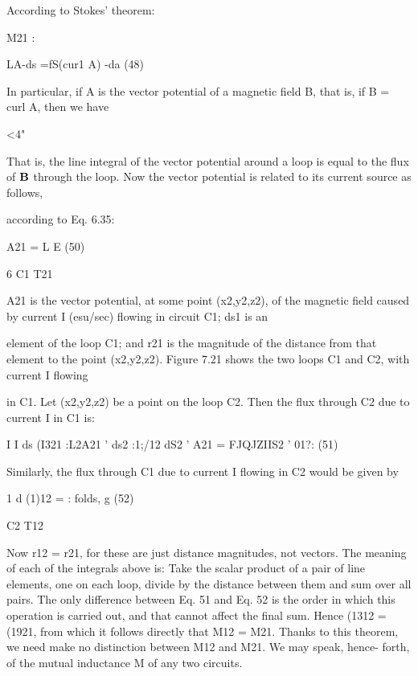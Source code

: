 According to Stokes' theorem:

\begin{equation}
\end{equation}
M21 :

LA-ds =fS(cur1 A) -da (48)

In particular, if A is the vector potential of a magnetic field B, that is,
if B = curl A, then we have

\begin{equation}
\end{equation}
<4"

That is, the line integral of the vector potential around a loop is equal
to the flux of $\mathbf{B}$ through the loop.
Now the vector potential is related to its current source as follows,

according to Eq. 6.35:

\begin{equation}
\end{equation}
A21 = L E (50)

6 C1 T21

A21 is the vector potential, at some point (x2,y2,z2), of the magnetic
field caused by current I (esu/sec) flowing in circuit C1; ds1 is an

element of the loop C1; and r21 is the magnitude of the distance from
that element to the point (x2,y2,z2).
Figure 7.21 shows the two loops C1 and C2, with current I flowing

in C1. Let (x2,y2,z2) be a point on the loop C2. Then the flux
through C2 due to current I in C1 is:

\begin{equation}
\end{equation}
I I ds
(I321 :L2A21 ' ds2 :1;/12 dS2 ' A21 = FJQJZIIS2 ' 01?: (51)

Similarly, the flux through C1 due to current I flowing in C2 would
be given by

\begin{equation}
\end{equation}
1 d
(1)12 = : folds, g (52)

C2 T12

Now r12 = r21, for these are just distance magnitudes, not vectors.
The meaning of each of the integrals above is: Take the scalar product
of a pair of line elements, one on each loop, divide by the distance
between them and sum over all pairs. The only difference between
Eq. 51 and Eq. 52 is the order in which this operation is carried out,
and that cannot affect the final sum. Hence (1312 = (1921, from which
it follows directly that M12 = M21. Thanks to this theorem, we need
make no distinction between M12 and M21. We may speak, hence-
forth, of the mutual inductance M of any two circuits.

